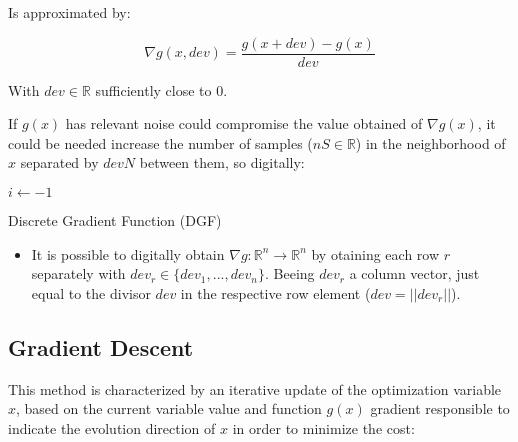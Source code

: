 Is approximated by:

\begin{equation}
    \nabla g(x, dev) = \frac{g(x + dev) - g(x)}{dev}
    \label{eq:Gradient_Discretization}
\end{equation}

With \(dev \in \mathbb{R}\) sufficiently close to \(0\). \par

If \(g(x)\) has relevant noise could compromise the value obtained of \(\nabla g(x)\), it could be needed increase the number of samples (\(nS \in \mathbb{R}\)) in the neighborhood of \(x\) separated by \(devN\) between them, so digitally:
  \begin{algorithm}
    $i\gets -1$\;
    \caption{Discrete Gradient Function (DGF)} \label{alg:Discrete_Gradient_Function}
  \end{algorithm}

\begin{tcolorbox}[colback=blue!5!white,colframe=blue!35!white,title=Notes:]
\begin{itemize}
    \item It is possible to digitally obtain \(\nabla g : \mathbb{R}^n \to \mathbb{R}^n\) by otaining each row \(r\) separately with \(dev_r \in \{ dev_1, ..., dev_n \} \). Beeing \(dev_r \) a column vector, just equal to the divisor \(dev\) in the respective row element (\(dev = ||dev_r||\)).
\end{itemize}
\end{tcolorbox} 



\subsection{Gradient Descent}
\label{subsec:Gradient_Descent} 

This method is characterized by an iterative update of the optimization variable \(x\), based on the current variable value and function \(g(x)\) gradient responsible to indicate the evolution direction of \(x\) in order to minimize the cost:

